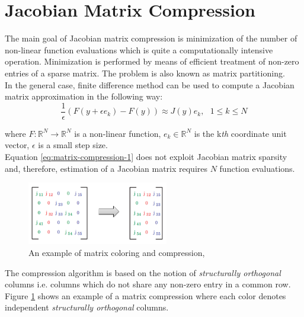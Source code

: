 \section{Jacobian Matrix Compression}
\label{sec:jacobian-matrix-compression}


The main goal of Jacobian matrix compression is minimization of the number of non-linear function evaluations which is quite a computationally intensive operation. Minimization is performed by means of efficient treatment of non-zero entries of a sparse matrix. The problem is also known as matrix partitioning.\\


In the general case, finite difference method can be used to compute a Jacobian matrix approximation in the following way:\\

\begin{equation} \label{eq:matrix-compression-1}
	\frac{1}{\epsilon} (F(y + \epsilon e_{k}) - F(y)) \approx J(y) e_{k}, \: \: \: 1 \leq k \leq N
\end{equation}

where $F : \mathbb{R}^{N} \rightarrow \mathbb{R}^{N}$  is a non-linear function, $e_{k} \in \mathbb{R}^{N}$ is the k\textit{th} coordinate unit vector, $\epsilon$ is a small step size.\\


Equation \ref{eq:matrix-compression-1} does not exploit Jacobian matrix sparsity and, therefore, estimation of a Jacobian matrix requires $N$ function evaluations.\\


\figpointer{\ref{fig:example-of-matrix-compression}}
\begin{figure}[htpb]
  \centering
  \includegraphics[width=0.55\textwidth]{figures/chapter-3/matrix-compression-example.png}
\caption{An example of matrix coloring and compression, \cite{gebremedhin2005color}}
\label{fig:example-of-matrix-compression}
\end{figure}


The compression algorithm is based on the notion of \textit{structurally orthogonal} columns i.e. columns which do not share any non-zero entry in a common row. Figure \ref{fig:example-of-matrix-compression} shows an example of a matrix compression where each color denotes independent \textit{structurally orthogonal} columns.\\


